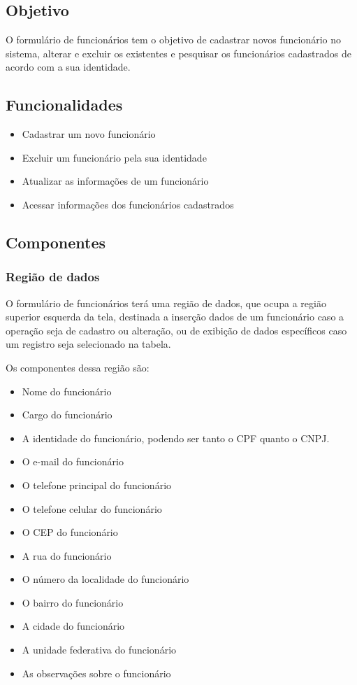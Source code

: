 \documentclass[
	article,			%
	12pt,				%
	oneside,			%
	a4paper,			%
	english,			%
	brazil,				%
	sumario=tradicional
	]{abntex2}
\begin{document}
	\subsection{Objetivo}
	O formulário de funcionários tem o objetivo de cadastrar novos funcionário no sistema, alterar e excluir os existentes e pesquisar os funcionários cadastrados de acordo com a sua identidade.
	\subsection{Funcionalidades}
	\begin{itemize}
		\item Cadastrar um novo funcionário
		\item Excluir um funcionário pela sua identidade
		\item Atualizar as informações de um funcionário
		\item Acessar informações dos funcionários cadastrados
		\end{itemize}
	\subsection{Componentes}
	\subsubsection{Região de dados}
	O formulário de funcionários terá uma região de dados, que ocupa a região superior esquerda da tela, destinada a inserção dados de um funcionário caso a operação seja de cadastro ou alteração, ou de exibição de dados específicos caso um registro seja selecionado na tabela.
	
	Os componentes dessa região são:
	\begin{itemize}\itemsep1.5pt
		\item Nome do funcionário
		\item Cargo do funcionário
		\item A identidade do funcionário, podendo ser tanto o CPF quanto o CNPJ.
		\item O e-mail do funcionário
		\item O telefone principal do funcionário
		\item O telefone celular do funcionário
		\item O CEP do funcionário
		\item A rua do funcionário
		\item O número da localidade do funcionário
		\item O bairro do funcionário
		\item A cidade do funcionário
		\item A unidade federativa do funcionário
		\item As observações sobre o funcionário
	\end{itemize}	
\end{document}
